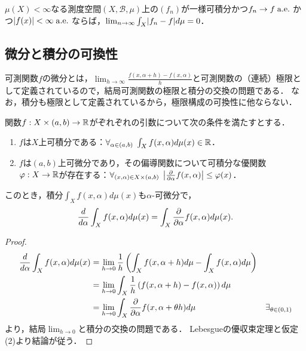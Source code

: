 \documentclass[uplatex, dvipdfmx]{jsreport}
\renewcommand{\B}{\mathcal{B}}
\begin{document}
\begin{theorem}[Vitali]
    $\mu(X)<\infty$なる測度空間$(X,\B,\mu)$上の$(f_n)$が一様可積分かつ$f_n\to f\;\mathrm{a.e.}\;$かつ$\lvert f(x)\rvert<\infty\;\mathrm{a.e.}\;$ならば，$\lim_{n\to\infty}\int_X\lvert f_n-f\rvert d\mu=0$．
\end{theorem}

\subsection{微分と積分の可換性}

\begin{tcolorbox}[colframe=ForestGreen, colback=ForestGreen!10!white,breakable,colbacktitle=ForestGreen!40!white,coltitle=black,fonttitle=\bfseries\sffamily,
title=]
    可測関数$f$の微分とは，$\lim_{h\to\infty}\frac{f(x,\alpha+h)-f(x,\alpha)}{h}$と可測関数の（連続）極限として定義されているので，結局可測関数の極限と積分の交換の問題である．
    なお，積分も極限として定義されているから，極限構成の可換性に他ならない．
\end{tcolorbox}

\begin{theorem}
    関数$f:X\times(a,b)\to\mathbb{R}$がぞれぞれの引数について次の条件を満たすとする．
    \begin{enumerate}
        \item $f$は$X$上可積分である：$\forall_{\alpha\in(a,b)}\;\int_Xf(x,\alpha)d\mu(x)\in\mathbb{R}$．
        \item $f$は$(a,b)$上可微分であり，その偏導関数について可積分な優関数$\varphi:X\to\mathbb{R}$が存在する：$\forall_{(x,\alpha)\in X\times(a,b)}\;\left|\frac{\partial }{\partial \alpha}f(x,\alpha)\right|\le \varphi(x)$．
    \end{enumerate}
    このとき，積分$\int_Xf(x,\alpha)d\mu(x)$も$\alpha$-可微分で，
    \[\frac{d }{d \alpha}\int_Xf(x,\alpha)d\mu(x)=\int_X\frac{\partial }{\partial \alpha}f(x,\alpha)d\mu(x).\]
\end{theorem}
\begin{proof}
    \begin{align*}
        \frac{d }{d \alpha}\int_Xf(x,\alpha)d\mu(x)&=\lim_{h\to0}\frac{1}{h}\left(\int_Xf(x,\alpha+h)d\mu-\int_Xf(x,\alpha)d\mu\right)\\
        &=\lim_{h\to0}\int_X\frac{1}{h}\left(f(x,\alpha+h)-f(x,\alpha)\right)d\mu\\
        &=\lim_{h\to0}\int_X\frac{\partial }{\partial \alpha}f(x,\alpha+\theta h)d\mu&\exists_{\theta\in(0,1)}
    \end{align*}
    より，結局$\lim_{h\to0}$と積分の交換の問題である．
    Lebesgueの優収束定理と仮定(2)より結論が従う．
\end{proof}
\end{document}
